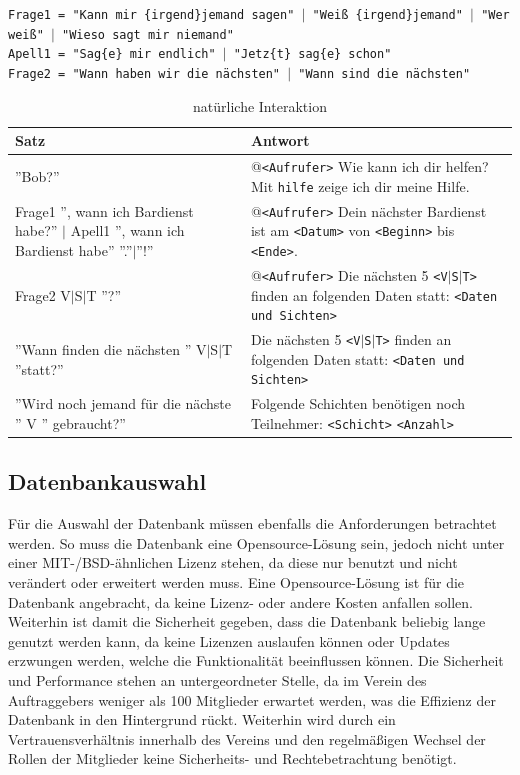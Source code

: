 \texttt{Frage1 = "Kann mir \{irgend\}jemand sagen" $|$ "Weiß \{irgend\}jemand" $|$ "Wer weiß" $|$ "Wieso sagt mir niemand"}\\
\texttt{Apell1 = "{}Sag\{e\} mir endlich" $|$ "Jetz\{t\} sag\{e\} schon"}\\
\texttt{Frage2 = "Wann haben wir die nächsten" $|$ "Wann sind die nächsten"}

\begin{table}[H]
\centering
\begin{tabularx}{\textwidth}{|p{5cm}|X|}
	\hline
	\textbf{Satz} & \textbf{Antwort} \\
	\hline
	''Bob?'' & @\texttt{<Aufrufer>} Wie kann ich dir helfen? Mit \texttt{hilfe} zeige ich dir meine Hilfe. \\
	\hline
	{Frage1 '', wann ich Bardienst habe?'' $|$ Apell1 '', wann ich Bardienst habe'' ''.''$|$''!''} & @\texttt{<Aufrufer>} Dein nächster Bardienst ist am \texttt{<Datum>} von \texttt{<Beginn>} bis \texttt{<Ende>}.\\
	\hline
	Frage2 V$|$S$|$T ''?'' & @\texttt{<Aufrufer>} Die nächsten 5 \texttt{<V$|$S$|$T>} finden an folgenden Daten statt: \texttt{<Daten und Sichten>}\\
	\hline
	''Wann finden die nächsten '' V$|$S$|$T ''statt?'' & Die nächsten 5 \texttt{<V$|$S$|$T>} finden an folgenden Daten statt: \texttt{<Daten und Sichten>}\\
	\hline
	''Wird noch jemand für die nächste '' V '' gebraucht?'' &  Folgende Schichten benötigen noch Teilnehmer: \texttt{<Schicht>} \texttt{<Anzahl>} \\
	\hline
\end{tabularx}
\caption{natürliche Interaktion}
\label{tab:natuerlicheinteraktion}
\end{table}


\subsection{Datenbankauswahl}

Für die Auswahl der Datenbank müssen ebenfalls die Anforderungen betrachtet werden. So muss die Datenbank eine Opensource-Lösung sein, jedoch nicht unter einer MIT-/BSD-ähnlichen Lizenz stehen, da diese nur benutzt und nicht verändert oder erweitert werden muss. Eine Opensource-Lösung ist für die Datenbank angebracht, da keine Lizenz- oder andere Kosten anfallen sollen. Weiterhin ist damit die Sicherheit gegeben, dass die Datenbank beliebig lange genutzt werden kann, da keine Lizenzen auslaufen können oder Updates erzwungen werden, welche die Funktionalität beeinflussen können. Die Sicherheit und Performance stehen an untergeordneter Stelle, da im Verein des Auftraggebers weniger als 100 Mitglieder erwartet werden, was die Effizienz der Datenbank in den Hintergrund rückt. Weiterhin wird durch ein Vertrauensverhältnis innerhalb des Vereins und den regelmäßigen Wechsel der Rollen der Mitglieder keine Sicherheits- und Rechtebetrachtung benötigt.

